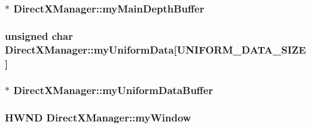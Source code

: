 \subsubsection[{\texorpdfstring{my\+Main\+Depth\+Buffer}{myMainDepthBuffer}}]{$\ast$ Direct\+X\+Manager\+::my\+Main\+Depth\+Buffer\hspace{0.3cm}{\ttfamily [protected]}}\hypertarget{class_direct_x_manager_a3626b7fb2456f6334b3442a16e4ec6f9}{}\label{class_direct_x_manager_a3626b7fb2456f6334b3442a16e4ec6f9}
\subsubsection[{\texorpdfstring{my\+Uniform\+Data}{myUniformData}}]{\setlength{\rightskip}{0pt plus 5cm}unsigned char Direct\+X\+Manager\+::my\+Uniform\+Data\mbox{[}U\+N\+I\+F\+O\+R\+M\+\_\+\+D\+A\+T\+A\+\_\+\+S\+I\+ZE\mbox{]}\hspace{0.3cm}{\ttfamily [protected]}}\hypertarget{class_direct_x_manager_ae04e85d0a8cc262e45d7af9024fe2051}{}\label{class_direct_x_manager_ae04e85d0a8cc262e45d7af9024fe2051}
\subsubsection[{\texorpdfstring{my\+Uniform\+Data\+Buffer}{myUniformDataBuffer}}]{$\ast$ Direct\+X\+Manager\+::my\+Uniform\+Data\+Buffer\hspace{0.3cm}{\ttfamily [protected]}}\hypertarget{class_direct_x_manager_a739e4f51ccf5cfff52387b4026c57e1d}{}\label{class_direct_x_manager_a739e4f51ccf5cfff52387b4026c57e1d}
\subsubsection[{\texorpdfstring{my\+Window}{myWindow}}]{\setlength{\rightskip}{0pt plus 5cm}H\+W\+ND Direct\+X\+Manager\+::my\+Window\hspace{0.3cm}{\ttfamily [protected]}}\hypertarget{class_direct_x_manager_aaa12b1687acb8f70bd1ac7245be80c07}{}\label{class_direct_x_manager_aaa12b1687acb8f70bd1ac7245be80c07}
